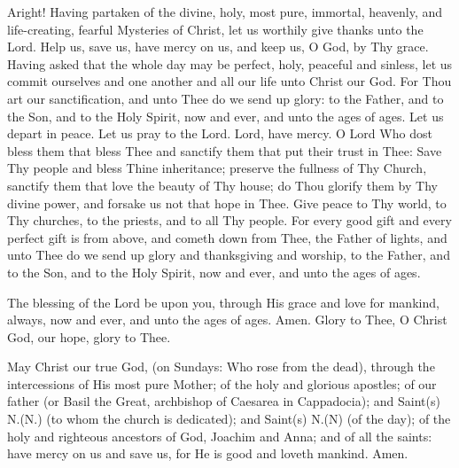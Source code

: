 \begin{liturgicaltext}
    \deacon Aright! Having partaken of the divine, holy, most pure, immortal, heavenly, and life-creating, fearful Mysteries of Christ, let us worthily give thanks unto the Lord. 
    \choir {}
    \deacon Help us, save us, have mercy on us, and keep us, O God, by Thy grace. 
    \choir {}
    \deacon Having asked that the whole day may be perfect, holy, peaceful and sinless, let us commit ourselves and one another and all our life unto Christ our God. 
    \choir {}
    \priest For Thou art our sanctification, and unto Thee do we send up glory: to the Father, and to the Son, and to the Holy Spirit, now and ever, and unto the ages of ages.
    \choir {}
    \priest Let us depart in peace. 
    \choir {}
    \deacon Let us pray to the Lord.
    \choir Lord, have mercy.
    \priest O Lord Who dost bless them that bless Thee and sanctify them that put their trust in Thee: Save Thy people and bless Thine inheritance; preserve the fullness of Thy Church, sanctify them that love the beauty of Thy house; do Thou glorify them by Thy divine power, and forsake us not that hope in Thee. Give peace to Thy world, to Thy churches, to the priests, and to all Thy people. For every good gift and every perfect gift is from above, and cometh down from Thee, the Father of lights, and unto Thee do we send up glory and thanksgiving and worship, to the Father, and to the Son, and to the Holy Spirit, now and ever, and unto the ages of ages.
    \choir
\end{liturgicaltext}
\begin{liturgicaltext}
    \priest The blessing of the Lord be upon you, through His grace and love for mankind, always, now and ever, and unto the ages of ages.
    \choir Amen.
    \priest Glory to Thee, O Christ God, our hope, glory to Thee.
    \choir
\end{liturgicaltext}
\begin{liturgicaltext}
    \priest May Christ our true God, (on Sundays: Who rose from the dead), through the intercessions of His most pure Mother; of the holy and glorious apostles; of our father (or Basil the Great, archbishop of Caesarea in Cappadocia); and Saint(s) N.(N.) (to whom the church is dedicated); and Saint(s) N.(N) (of the day); of the holy and righteous ancestors of God, Joachim and Anna; and of all the saints: have mercy on us and save us, for He is good and loveth mankind.
    \choir Amen.
\end{liturgicaltext}